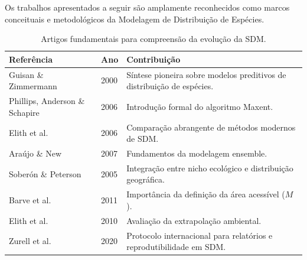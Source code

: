 \documentclass{ueap-sdm}
\begin{document}
Os trabalhos apresentados a seguir são amplamente reconhecidos como marcos
conceituais e metodológicos da Modelagem de Distribuição de Espécies.

\begin{table}[H]
	\centering
	\caption{Artigos fundamentais para compreensão da evolução da SDM.}
	\label{tab:artigos_classicos_sdm}
	
	\small
	
	\begin{tabular}{
			p{}
			p{}
			p{}
		}
		
		\toprule
		
		\textbf{Referência} &
		\textbf{Ano} &
		\textbf{Contribuição}
		
		\\
		\midrule
		
		Guisan \& Zimmermann &
		2000 &
		Síntese pioneira sobre modelos preditivos de distribuição de espécies.
		
		\\
		
		Phillips, Anderson \& Schapire &
		2006 &
		Introdução formal do algoritmo Maxent.
		
		\\
		
		Elith et al. &
		2006 &
		Comparação abrangente de métodos modernos de SDM.
		
		\\
		
		Araújo \& New &
		2007 &
		Fundamentos da modelagem ensemble.
		
		\\
		
		Soberón \& Peterson &
		2005 &
		Integração entre nicho ecológico e distribuição geográfica.
		
		\\
		
		Barve et al. &
		2011 &
		Importância da definição da área acessível ($M$).
		
		\\
		
		Elith et al. &
		2010 &
		Avaliação da extrapolação ambiental.
		
		\\
		
		Zurell et al. &
		2020 &
		Protocolo internacional para relatórios e reprodutibilidade em SDM.
		
		\\
		
		\bottomrule
		
	\end{tabular}
	
\end{table}
\end{document}
